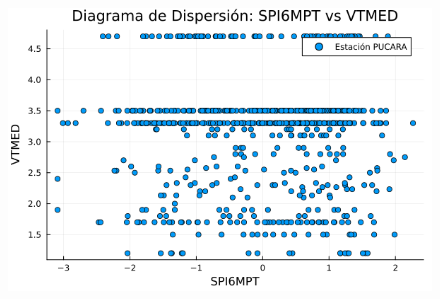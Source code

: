 \begin{figure}[htbp]
\begin{minipage}{0.32\textwidth}
    \includegraphics[width=\linewidth]{Capitulos/Scaterplot/PUCARA_SPI6MPT_vs_VTMED.png}
\end{minipage}

\vspace{0.5cm}  %


\end{figure}

